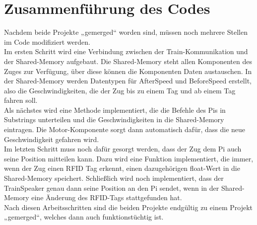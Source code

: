 \section{Zusammenführung des Codes}

Nachdem beide Projekte „gemerged“ worden sind, müssen noch mehrere Stellen im Code modifiziert werden.\\
Im ersten Schritt wird eine Verbindung zwischen der Train-Kommunikation und der Shared-Memory aufgebaut. Die Shared-Memory steht allen Komponenten des Zuges zur Verfügung, über diese können die Komponenten Daten austauschen. In der Shared-Memory werden Datentypen für AfterSpeed und BeforeSpeed erstellt, also die Geschwindigkeiten, die der Zug bis zu einem Tag und ab einem Tag fahren soll.\\
Als nächstes wird eine Methode implementiert, die die Befehle des Pis in Substrings unterteilen und die Geschwindigkeiten in die Shared-Memory eintragen. Die Motor-Komponente sorgt dann automatisch dafür, dass die neue Geschwindigkeit gefahren wird.\\
Im letzten Schritt muss noch dafür gesorgt werden, dass der Zug dem Pi auch seine Position mitteilen kann. Dazu wird eine Funktion implementiert, die immer, wenn der Zug einen RFID Tag erkennt, einen dazugehörigen float-Wert in die Shared-Memory speichert. Schließlich wird noch implementiert, dass der TrainSpeaker genau dann seine Position an den Pi sendet, wenn in der Shared-Memory eine Änderung des RFID-Tags stattgefunden hat.\\
Nach diesen Arbeitsschritten sind die beiden Projekte endgültig  zu einem Projekt „gemerged“, welches dann auch funktionstüchtig ist.
